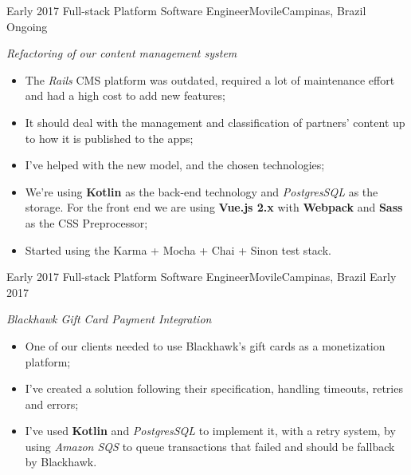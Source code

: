 %
%
%


\begin{experiences}
  \experience
  {Early 2017} {Full-stack Platform Software Engineer}{Movile}{Campinas, Brazil}
  {Ongoing}
        {
        \emph{Refactoring of our content management system}\\
          \begin{itemize}
            \item The \emph{Rails} CMS platform was outdated, required a lot of maintenance effort and had a high cost to add new features;
            \item It should deal with the management and classification of partners' content up to how it is published to the apps;
            \item I've helped with the new model, and the chosen technologies;
            \item We're using \textbf{Kotlin} as the back-end technology and \emph{PostgresSQL} as the storage. For the front end we are using \textbf{Vue.js 2.x} with \textbf{Webpack} and \textbf{Sass} as the CSS Preprocessor;
            \item Started using the Karma + Mocha + Chai + Sinon test stack.\\
          \end{itemize}
        }{}
  \experience
  {Early 2017} {Full-stack Platform Software Engineer}{Movile}{Campinas, Brazil}
  {Early 2017}
        {
        \emph{Blackhawk Gift Card Payment Integration}\\
          \begin{itemize}
            \item One of our clients needed to use Blackhawk's gift cards as a monetization platform;
            \item I've created a solution following their specification, handling timeouts, retries and errors;
            \item I've used \textbf{Kotlin} and \emph{PostgresSQL} to implement it, with a retry system, by using \emph{Amazon SQS} to queue
            transactions that failed and should be fallback by Blackhawk.\\

\end{itemize}}
\end{experiences}
